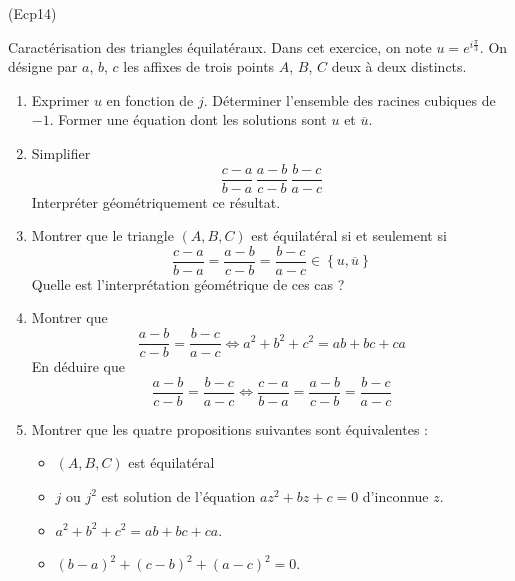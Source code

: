 \begin{tiny}(Ecp14)\end{tiny} \label{cp14} Caractérisation des triangles équilatéraux.\newline
Dans cet exercice, on note $u=e^{i\frac{\pi}{3}}$. On désigne par $a$, $b$, $c$ les affixes de trois points $A$, $B$, $C$ deux à deux distincts.
\begin{enumerate}
 \item Exprimer $u$ en fonction de $j$. Déterminer l'ensemble des racines cubiques de $-1$. Former une équation dont les solutions sont $u$ et $\overline{u}$.
 \item Simplifier
\begin{displaymath}
 \frac{c-a}{b-a}\, \frac{a-b}{c-b}\, \frac{b-c}{a-c}
\end{displaymath}
Interpréter géométriquement ce résultat.

\item Montrer que le triangle $(A,B,C)$ est équilatéral si et seulement si
\begin{displaymath}
 \frac{c-a}{b-a} = \frac{a-b}{c-b} = \frac{b-c}{a-c} \in \left\lbrace u, \overline{u}\right\rbrace 
\end{displaymath}
Quelle est l'interprétation géométrique de ces cas ?

\item Montrer que
\begin{displaymath}
\frac{a-b}{c-b} = \frac{b-c}{a-c}
\Leftrightarrow
 a^2 + b^2 + c^2 =  ab+bc+ca
\end{displaymath}
En déduire que 
\begin{displaymath}
\frac{a-b}{c-b} = \frac{b-c}{a-c}
\Leftrightarrow
 \frac{c-a}{b-a} = \frac{a-b}{c-b} = \frac{b-c}{a-c}
\end{displaymath}

\item Montrer que les quatre propositions suivantes sont équivalentes :
\begin{itemize}
 \item $(A,B,C)$  est équilatéral
 \item $j$ ou $j^2$ est solution de l'équation $az^2+bz+c=0$ d'inconnue $z$.
 \item $a^2+b^2+c^2 = ab+bc+ca$.
 \item $(b-a)^2 + (c-b)^2 + (a-c)^2 =0$. 
\end{itemize}
\end{enumerate}
